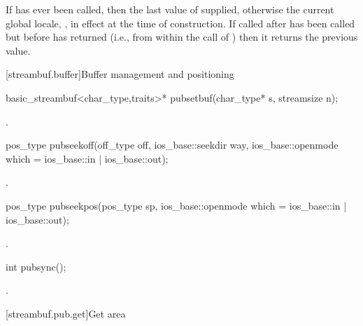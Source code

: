 \begin{itemdescr}
\pnum
\returns
If
has ever been called, then the last value of  supplied,
otherwise the current global locale,
,
in effect at the time of construction.
If called after
has been called but before
has returned (i.e., from within the call of
)
then it returns the previous value.
\end{itemdescr}

[streambuf.buffer]{Buffer management and positioning}

%
\begin{itemdecl}
basic_streambuf<char_type,traits>* pubsetbuf(char_type* s, streamsize n);
\end{itemdecl}

\begin{itemdescr}
\pnum
\returns
{}.
\end{itemdescr}

%
\begin{itemdecl}
pos_type pubseekoff(off_type off, ios_base::seekdir way,
               ios_base::openmode which = ios_base::in | ios_base::out);
\end{itemdecl}

\begin{itemdescr}
\pnum
\returns
{}.
\end{itemdescr}

%
\begin{itemdecl}
pos_type pubseekpos(pos_type sp,
               ios_base::openmode which = ios_base::in | ios_base::out);
\end{itemdecl}

\begin{itemdescr}
\pnum
\returns
{}.
\end{itemdescr}

%
\begin{itemdecl}
int pubsync();
\end{itemdecl}

\begin{itemdescr}
\pnum
\returns
{}.
\end{itemdescr}

[streambuf.pub.get]{Get area}

